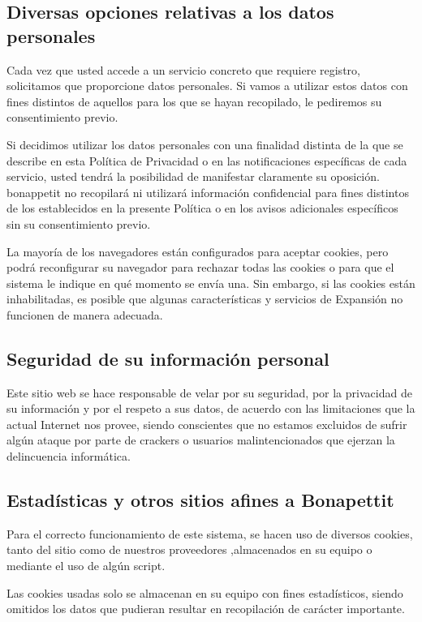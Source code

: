 \subsection{Diversas opciones relativas a los datos personales}
Cada vez que usted accede a un servicio concreto que requiere registro, solicitamos que proporcione datos personales. Si vamos a utilizar estos datos con fines distintos de aquellos para los que se hayan recopilado, le pediremos su consentimiento previo.


Si decidimos utilizar los datos personales con una finalidad distinta de la que se describe en esta Política de Privacidad o en las notificaciones específicas de cada servicio, usted tendrá la posibilidad de manifestar claramente su oposición.
bonappetit no recopilará ni utilizará información confidencial para fines distintos de los establecidos en la presente Política o en los avisos adicionales específicos sin su consentimiento previo.

La mayoría de los navegadores están configurados para aceptar cookies, pero podrá
reconfigurar su navegador para rechazar todas las cookies o para que el sistema le
indique en qué momento se envía una. Sin embargo, si las cookies están inhabilitadas, es posible que algunas características y servicios de Expansión no funcionen de manera adecuada.

\subsection{Seguridad de su información personal}
Este sitio web se hace responsable de velar por su seguridad, por la privacidad de su información y por el respeto a sus datos, de acuerdo con las limitaciones que la actual Internet nos provee, siendo conscientes que no estamos excluidos de sufrir algún ataque por parte de crackers o usuarios malintencionados que ejerzan la delincuencia informática.
\subsection{Estadísticas y otros sitios afines a Bonapettit}
Para el correcto funcionamiento de este sistema, se hacen uso de diversos cookies, tanto del sitio como de nuestros proveedores ,almacenados en su equipo o mediante el uso de algún script.

Las cookies usadas solo se almacenan en su equipo con fines estadísticos, siendo omitidos los datos que pudieran resultar en recopilación de carácter importante.

